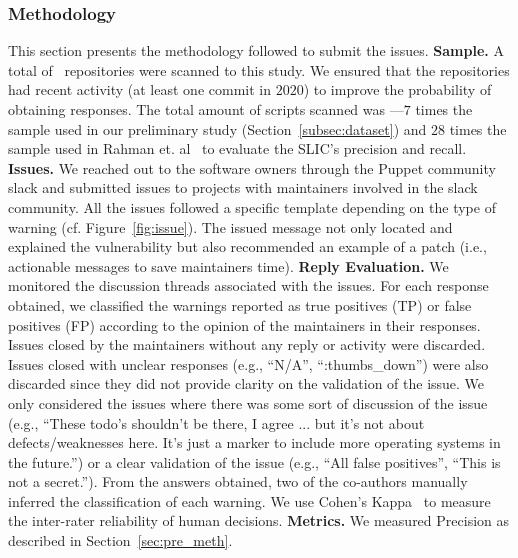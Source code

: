 \subsubsection{Methodology} This section presents the methodology 
followed to submit the issues. \textbf{Sample.} A total of
\botWarningsRepos{} \github\ repositories were scanned to this
study. We ensured that the repositories had recent activity (at least
one commit in $2020$) to improve the probability of obtaining
responses. The total amount of scripts scanned was
\botTotalScripts{}
---$7$ times the sample used in our preliminary
study (Section~\ref{subsec:dataset}) and $28$ times the sample used in
Rahman et. al~\cite{8812041} to evaluate the SLIC's precision and
recall. 
\textbf{Issues.} We reached out to the software owners 
through the Puppet community slack and submitted issues to projects 
with maintainers involved in the slack community. All the issues followed
a specific template depending on the type of warning
(cf. Figure~\ref{fig:issue}). The issued message not only located and
explained the vulnerability but also recommended an example of a
patch (i.e., actionable messages to save maintainers time). \textbf{Reply Evaluation.} We monitored the discussion threads
associated with the issues. For each response obtained, we classified
the warnings reported as true positives (TP) or false positives (FP)
according to the opinion of the maintainers in their responses.
Issues closed by the maintainers without any reply or activity were discarded.
Issues closed with unclear responses (e.g., 
``N/A'', ``:thumbs\_down'') were also discarded since they did not provide
clarity on the validation of the issue. We only considered the issues where there was some sort 
of discussion of the issue (e.g., ``These todo's shouldn't be there, I agree ... but it's not about defects/weaknesses here. It's 
just a marker to include more operating systems in the future.'') or a clear validation of the issue (e.g., ``All false positives'', ``This is not a secret.'').
From the answers
obtained, two of the co-authors manually inferred the classification
of each warning. We use Cohen's Kappa~\cite{cohen1960coefficient} to
measure the inter-rater reliability of human
decisions. \textbf{Metrics.} We measured Precision as
described in Section~\ref{sec:pre_meth}. 


